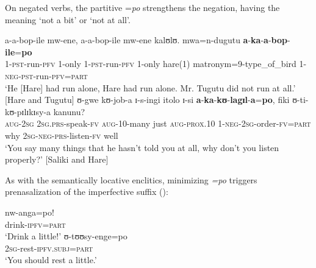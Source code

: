 On negated verbs, the partitive =\textit{po} strengthens the negation, having the meaning \lq not a bit' or \lq not at all'.
\begin{exe}
	\ex \gll a-a-bop-ile mw-ene, a-a-bop-ile mw-ene kalʊlʊ. mwa=n-dugutu \textbf{a}-\textbf{ka}-\textbf{a}-\textbf{bop}-\textbf{ile}=\textbf{po}\\
	1-\textsc{pst}-run-\textsc{pfv} 1-only 1-\textsc{pst}-run-\textsc{pfv} 1-only hare(1) matronym=9-type\_of\_bird 1-\textsc{neg}-\textsc{pst}-run-\textsc{pfv}=\textsc{part}\\
	\glt `He [Hare] had run alone, Hare had run alone. Mr. Tugutu did not run at all.' [Hare and Tugutu]
	\ex \gll ʊ-gwe kʊ-job-a ɪ-s-ingi itolo ɪ-si \textbf{a}-\textbf{ka}-\textbf{kʊ}-\textbf{lagɪl}-\textbf{a}=\textbf{po}, fiki ʊ-ti-kʊ-pɪlɪkɪsy-a kanunu?\\
	\textsc{aug}-\textsc{2sg} \textsc{2sg.prs}-speak-\textsc{fv} \textsc{aug}-10-many just \textsc{aug}-\textsc{prox.10} 1-\textsc{neg}-\textsc{2sg}-order-\textsc{fv}=\textsc{part} why \textsc{2sg}-\textsc{neg}-\textsc{prs}-listen-\textsc{fv} well\\
	\glt `‎‎You say many things that he hasn't told you at all, why don't you listen properly?' [Saliki and Hare]
\end{exe}

As with the semantically locative enclitics, minimizing \textit{=po} triggers prenasalization of the imperfective suffix ():
\begin{exe}
	\ex 
	\begin{xlist}
		\ex \gll nw-anga=po!\\
		drink-\textsc{ipfv}=\textsc{part}\\
		\glt `Drink a little!'
		\ex \gll ʊ-tʊʊsy-enge=po\\
		\textsc{2sg}-rest-\textsc{ipfv.subj}=\textsc{part}\\
		\glt `You should rest a little.'
	\end{xlist}
\end{exe}

